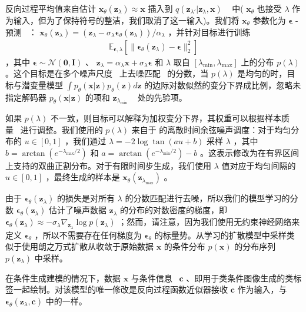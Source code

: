 \documentclass{article}
\newcommand{\E}{\mathbb{E}}
\newcommand{\Eb}[2]{\E_{#1}\!\left[#2\right]}
\newcommand{\bI}{\mathbf{I}}
\newcommand{\bzero}{\mathbf{0}}
\newcommand{\bc}{\mathbf{c}}
\newcommand{\bx}{\mathbf{x}}
\newcommand{\bz}{\mathbf{z}}
\newcommand{\bepsilon}{{\boldsymbol{\epsilon}}}
\begin{document}
反向过程平均值来自估计 $\bx_\theta(\bz_\lambda) \approx \bx$ 插入到 $q(\bz_{\lambda'}|\bz_\lambda,\bx)$ ~ \citep{ho2020denoising,kingma2021variational} 中( $\bx_\theta$ 也接受 $\lambda$ 作为输入，但为了保持符号的整洁，我们取消了这一输入)。我们将 $\bx_\theta$ 参数化为 $\bepsilon$ -预测~ \citep{ho2020denoising} ： $\bx_\theta(\bz_\lambda) = (\bz_\lambda - \sigma_\lambda \bepsilon_\theta(\bz_\lambda)) / \alpha_\lambda$ ，并针对目标进行训练
 \begin{align}
    \Eb{\bepsilon,\lambda}{\|\bepsilon_\theta(\bz_\lambda) - \bepsilon \|^2_2}
\end{align} ，其中 $\bepsilon\sim\mathcal{N}(\bzero,\bI)$ 、 $\bz_\lambda = \alpha_\lambda\bx + \sigma_\lambda\bepsilon$ 和 $\lambda$ 取自 $[\lambda_{\mathrm{min}}, \lambda_{\mathrm{max}}]$ 上的分布 $p(\lambda)$ 。这个目标是在多个噪声尺度~ \citep{song2019generative} 上去噪匹配~ \citep{vincent2011connection,hyvarinen2005estimation} 的分数，当 $p(\lambda)$ 是均匀的时，目标与潜变量模型 $\int p_\theta(\bx|\bz) p_\theta(\bz) d\bz$ 的边际对数似然的变分下界成比例，忽略未指定解码器 $p_\theta(\bx|\bz)$ 的项和 $\bz_{\lambda_\mathrm{min}}$ ~ \citep{kingma2021variational} 处的先验项。


如果 $p(\lambda)$ 不一致，则目标可以解释为加权变分下界，其权重可以根据样本质量~ \citep{ho2020denoising,kingma2021variational} 进行调整。我们使用的 $p(\lambda)$ 来自于 \citet{nichol2021improved} 的离散时间余弦噪声调度：对于均匀分布的 $u \in [0,1]$ ，我们通过 $\lambda = -2\log\tan(au+b)$ 采样 $\lambda$ ，其中 $b = \arctan(e^{-\lambda_{\mathrm{max}}/2})$ 和 $a = \arctan(e^{-\lambda_{\mathrm{min}}/2}) - b$ 。这表示修改为在有界区间上支持的双曲正割分布。对于有限时间步生成，我们使用 $\lambda$ 值对应于均匀间隔的 $u \in [0, 1]$ ，最终生成的样本是 $\bx_\theta(\bz_{\lambda_\mathrm{max}})$ 。


由于 $\bepsilon_\theta(\bz_\lambda)$ 的损失是对所有 $\lambda$ 的分数匹配进行去噪，所以我们的模型学习的分数 $\bepsilon_\theta(\bz_\lambda)$ 估计了噪声数据 $\bz_\lambda$ 的分布的对数密度的梯度，即 $\bepsilon_\theta(\bz_\lambda) \approx -\sigma_\lambda \nabla_{\bz_\lambda}\log p(\bz_\lambda)$ ；然而，请注意，因为我们使用无约束神经网络来定义 $\bepsilon_\theta$ ，所以不需要存在任何梯度为 $\bepsilon_\theta$ 的标量势。从学习的扩散模型中采样类似于使用朗之万式扩散从收敛于原始数据 $\bx$ 的条件分布 $p(\bx)$ 的分布序列 $p(\bz_\lambda)$ 中采样。


在条件生成建模的情况下，数据 $\bx$ 与条件信息~ $\bc$ 、即用于类条件图像生成的类标签一起绘制。对该模型的唯一修改是反向过程函数近似器接收 $\bc$ 作为输入，与 $\bepsilon_\theta(\bz_\lambda, \bc)$ 中的一样。
\end{document}
